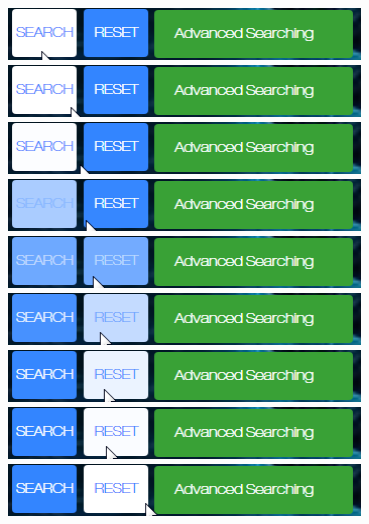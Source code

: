 \documentclass[10pt,twoside,a4paper,titlepage]{article}
\begin{document}
 	\newline	
 	\includegraphics[width=0.7\textwidth]{cyf/search7.png}
 	\newline
	\includegraphics[width=0.7\textwidth]{cyf/reset1.png}
	\newline
	\includegraphics[width=0.7\textwidth]{cyf/reset2.png}
	\newline
	\includegraphics[width=0.7\textwidth]{cyf/reset3.png}
	\newline	
	\includegraphics[width=0.7\textwidth]{cyf/reset4.png}
	\newline	
	\includegraphics[width=0.7\textwidth]{cyf/reset5.png}
	\newline	
	\includegraphics[width=0.7\textwidth]{cyf/reset6.png}
	\newline	
	\includegraphics[width=0.7\textwidth]{cyf/reset7.png}
	\newline
	\includegraphics[width=0.7\textwidth]{cyf/Advanced_searching1.png}
\end{document}
